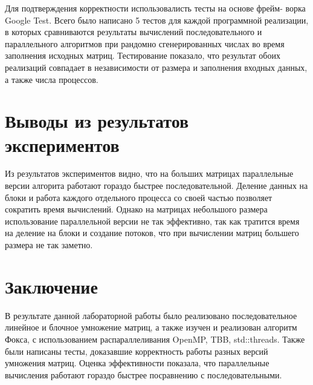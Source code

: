 \documentclass{report}
\begin{document}
\begin{table}[!h]
\centering
{}
\caption{Результаты экспериментов с std::threads, 4 процесса}
\end{table}


Для подтверждения корректности использовалисть тесты на основе фрейм-
ворка Google Test. Всего было написано 5 тестов для каждой программной реализации, в которых сравниваются результаты вычислений последовательного и параллельного алгоритмов при рандомно сгенерированных числах во время заполнения исходных матриц. Тестирование показало, что результат обоих реализаций совпадает в независимости от размера и заполнения входных данных, а также числа процессов.
\newpage

\section*{Выводы из результатов экспериментов}
Из результатов экспериментов видно, что на больших матрицах параллельные версии алгорита работают гораздо быстрее последовательной. Деление данных на блоки и работа каждого отдельного процесса со своей частью позволяет сократить время вычислений. Однако на матрицах небольшого размера использование параллельной версии не так эффективно, так как тратится время на деление на блоки и создание потоков, что при вычислении матриц большего размера не так заметно.

\newpage

\section*{Заключение}
В результате данной лабораторной работы было реализовано последовательное линейное и блочное умножение матриц, а также изучен и реализован алгоритм Фокса, с использованием распараллеливания OpenMP, TBB, std::threads. Также были написаны тесты, доказавшие корректность работы разных версий умножения матриц. Оценка эффективности показала, что параллельные вычисления работают гораздо быстрее посравнению с последовательными.
\end{document}
